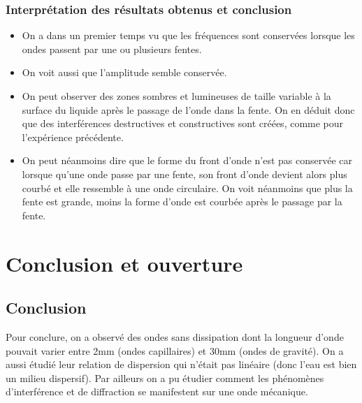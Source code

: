 \documentclass{report}
\begin{document}
\subsection{Interprétation des résultats obtenus et conclusion} 
\begin{itemize}[label = ]
    \item On a dans un premier temps vu que les fréquences sont conservées lorsque les ondes passent par une ou plusieurs fentes.
    \item On voit aussi que l'amplitude semble conservée.
    \item On peut observer des zones sombres et lumineuses de taille variable à la surface du liquide après le passage de l'onde dans la fente. On en déduit donc que des interférences destructives et constructives sont créées, comme pour l'expérience précédente.
    \item On peut néanmoins dire que le forme du front d'onde n'est pas conservée car lorsque qu'une onde passe par une fente, son front d'onde  devient alors plus courbé et elle ressemble à une onde circulaire. On voit néanmoins que plus la fente est grande, moins la forme d'onde est courbée après le passage par la fente.
\end{itemize}

\chapter{Conclusion et ouverture}

\section{Conclusion}
Pour conclure, on a observé des ondes sans dissipation dont la longueur d’onde pouvait varier entre 2mm (ondes capillaires) et 30mm (ondes de
gravité). On a aussi étudié leur relation de dispersion qui n’était pas linéaire (donc l’eau est bien un milieu dispersif). Par ailleurs on
a pu étudier comment les phénomènes d’interférence et de diffraction se manifestent sur une onde mécanique.
\end{document}
